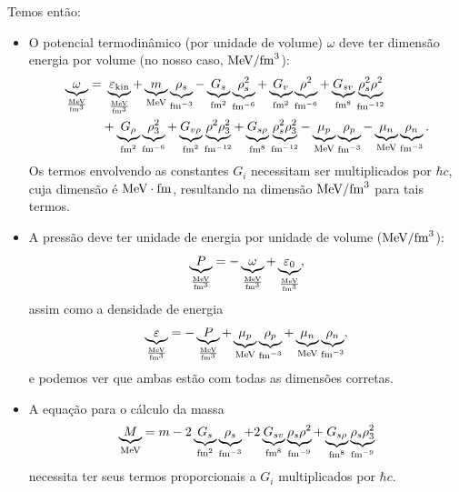 \begin{enumerate}
Temos então:
\begin{fullwidth}
\begin{itemize}

\item O potencial termodinâmico (por unidade de volume) $\omega$ deve ter dimensão energia por volume (no nosso caso, $\rm{MeV}/\rm{fm}^3$):
\begin{equation}
\begin{split}
	\underbrace{\omega}_{\frac{\rm{MeV}}{\rm{fm}^3}} =&~ \underbrace{\varepsilon_{\rm{kin}}}_{\frac{\rm{MeV}}{\rm{fm}^3}} +\underbrace{m}_{\rm{MeV}}\underbrace{\rho_s}_{\rm{fm}^{-3}} - \underbrace{G_s}_{\rm{fm}^2}\underbrace{\rho_s^2}_{\rm{fm}^{-6}} + \underbrace{G_v}_{\rm{fm}^2}\underbrace{\rho^2}_{\rm{fm}^{-6}} + \underbrace{G_{sv}}_{\rm{fm}^8}\underbrace{\rho_s^2\rho^2}_{\rm{fm}^{-12}} \\
&+ \underbrace{G_\rho}_{\rm{fm}^2}\underbrace{\rho_3^2}_{\rm{fm}^{-6}} + \underbrace{G_{v\rho}}_{\rm{fm}^2}\underbrace{\rho^2\rho_3^2}_{\rm{fm}^{-12}} + \underbrace{G_{s\rho}}_{\rm{fm}^8}\underbrace{\rho_s^2\rho_3^2}_{\rm{fm}^{-12}} - \underbrace{\mu_p}_{\rm{MeV}}\underbrace{\rho_p}_{\rm{fm}^{-3}} - \underbrace{\mu_n}_{\rm{MeV}}\underbrace{\rho_n}_{\rm{fm}^{-3}}.
\end{split}
\end{equation}
%
Os termos envolvendo as constantes $G_i$ necessitam ser multiplicados por $\hbar c$, cuja dimensão é $\rm{MeV}\cdot\rm{fm}$, resultando na dimensão $\rm{MeV}/\rm{fm}^3$ para tais termos.

\item A pressão deve ter unidade de energia por unidade de volume ($\rm{MeV}/\rm{fm}^3$):
\begin{equation}
	\underbrace{P}_{\frac{\rm{MeV}}{\rm{fm}^3}} = - \underbrace{\omega}_{\frac{\rm{MeV}}{\rm{fm}^3}} + \underbrace{\varepsilon_0}_{\frac{\rm{MeV}}{\rm{fm}^3}},
\end{equation}
%
assim como a densidade de energia
\begin{equation}
	\underbrace{\varepsilon}_{\frac{\rm{MeV}}{\rm{fm}^3}} = - \underbrace{P}_{\frac{\rm{MeV}}{\rm{fm}^3}} + \underbrace{\mu_p}_{\rm{MeV}}\underbrace{\rho_p}_{\rm{fm}^{-3}} + \underbrace{\mu_n}_{\rm{MeV}}\underbrace{\rho_n}_{\rm{fm}^{-3}},
\end{equation}
%
e podemos ver que ambas estão com todas as dimensões corretas.

\item A equação para o cálculo da massa
\begin{equation}
	\underbrace{M}_{\rm{MeV}} = m - 2 \underbrace{G_s}_{\rm{fm}^2} \underbrace{\rho_s}_{\rm{fm}^{-3}} + 2 \underbrace{G_{sv}}_{\rm{fm}^8}\underbrace{\rho_s\rho^2}_{\rm{fm}^{-9}} + \underbrace{G_{s\rho}}_{\rm{fm}^8}\underbrace{\rho_s\rho_3^2}_{\rm{fm}^{-9}}
\end{equation}
%
necessita ter seus termos proporcionais a $G_i$ multiplicados por $\hbar c$.


\end{itemize}
\end{fullwidth}
\end{enumerate}
